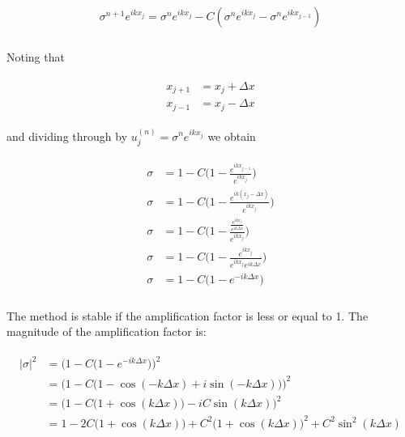 	\begin{align}
		\begin{split}
			\sigma ^{n+1}e^{ikx_j} = \sigma^{n}{e^{ikx_j}} - C(\sigma ^{n}e^{ikx_j} - \sigma ^{n}e^{ikx_{j-1}}) \\
		\end{split}
	\end{align}
	
	Noting that
	
	\begin{align}
		\begin{split}
			x_{j+1} &= x_j + \Delta x \\
			x_{j-1} &= x_j - \Delta x
		\end{split}
	\end{align}
	
	and dividing through by $u_j^{(n)} = \sigma^ne^{ikx_j}$ we obtain
	
	\begin{align}
		\begin{split}
			\sigma &= 1 - C\Big(1 - \frac{e^{ikx_{j-1}}}{e^{ikx_j}}\Big) \\
			\sigma &= 1 - C\Big(1 - \frac{e^{ik (x_j - \Delta x)}}{e^{ikx_j}}\Big) \\
			\sigma &= 1 - C\Big(1 - \frac{\frac{e^{ikx_j}}{e^{ik\Delta x}}}{e^{ikx_j}}\Big) \\
			\sigma &= 1 - C\Big(1 - \frac{e^{ikx_j}}{e^{ikx_j}e^{ik\Delta x}}\Big) \\
			\sigma &= 1 - C\Big(1 - e^{-ik\Delta x}\Big) \\
		\end{split}
	\end{align}
	
	The method is stable if the amplification factor is less or equal to 1. The magnitude of the amplification factor is:
	
	\begin{align}
		\begin{split}
			\label{app:for:sigmaExplicit}
			|\sigma|^2 &= \Bigg( 1 - C\Big(1 - e^{-ik\Delta x}\Big)\Bigg)^2 \\
			&= \Bigg( 1 - C\Big(1 -\cos(-k\Delta x) + i\sin(-k\Delta x)\Big)\Bigg)^2 \\
			&= \Bigg(1 - C\Big(1 +\cos(k\Delta x)\Big) - iC\sin(k\Delta x)\Bigg)^2 \\	
			&= 1 - 2C\Big(1 + \cos(k\Delta x)\Big) + C^2\Big(1 +\cos(k\Delta x)\Big)^2 + C^2\sin^2(k\Delta x)
		\end{split}
	\end{align} 
	
